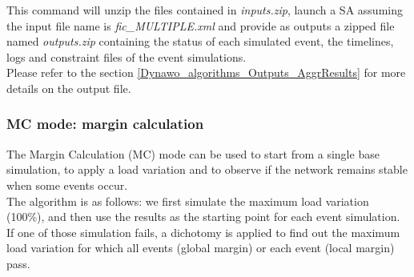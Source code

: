 \documentclass[a4paper, 12pt]{report}
\begin{document}
This command will unzip the files contained in \textit{inputs.zip}, launch a SA assuming the input file name is \textit{fic\_MULTIPLE.xml}
and provide as outputs a zipped file named \textit{outputs.zip} containing the status of each simulated event, 
the timelines, logs and constraint files of the \Dynawo event simulations.\\

Please refer to the section \ref{Dynawo_algorithms_Outputs_AggrResults} for more details on the output file.


\subsubsection{MC mode: margin calculation}

The Margin Calculation (MC) mode can be used to start from a single base simulation, to apply a load variation and to observe 
if the network remains stable when some events occur.\\
The algorithm is as follows: we first simulate the maximum load variation (100\%), and then use the results as the starting point for each event simulation.
If one of those simulation fails, a dichotomy is applied to find out the maximum load variation for which all events (global margin) or each event (local margin) pass.\\
\end{document}

